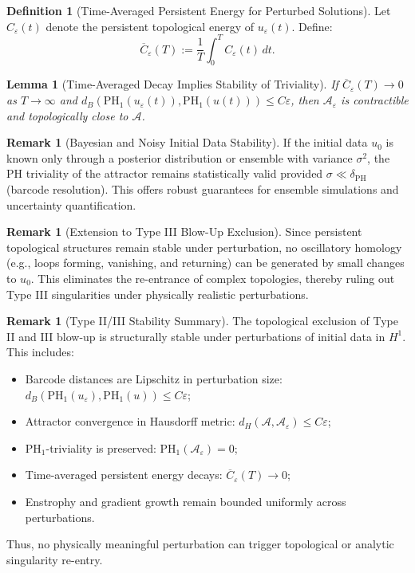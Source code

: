 \documentclass[11pt]{article}
\newtheorem{lemma}[theorem]{Lemma}
\theoremstyle{definition}
\newtheorem{definition}[theorem]{Definition}
\newtheorem{remark}[theorem]{Remark}
\begin{document}
\begin{definition}[Time-Averaged Persistent Energy for Perturbed Solutions]
Let $C_\varepsilon(t)$ denote the persistent topological energy of $u_\varepsilon(t)$. Define:
\[
\overline{C}_\varepsilon(T) := \frac{1}{T} \int_0^T C_\varepsilon(t)\, dt.
\]
\end{definition}

\begin{lemma}[Time-Averaged Decay Implies Stability of Triviality]
If $\overline{C}_\varepsilon(T) \to 0$ as $T \to \infty$ and $d_B(\mathrm{PH}_1(u_\varepsilon(t)), \mathrm{PH}_1(u(t))) \le C \varepsilon$, then $\mathcal{A}_\varepsilon$ is contractible and topologically close to $\mathcal{A}$.
\end{lemma}

\begin{remark}[Bayesian and Noisy Initial Data Stability]
If the initial data $u_0$ is known only through a posterior distribution or ensemble with variance $\sigma^2$, the PH triviality of the attractor remains statistically valid provided $\sigma \ll \delta_{\mathrm{PH}}$ (barcode resolution). This offers robust guarantees for ensemble simulations and uncertainty quantification.
\end{remark}

\begin{remark}[Extension to Type III Blow-Up Exclusion]
Since persistent topological structures remain stable under perturbation, no oscillatory homology (e.g., loops forming, vanishing, and returning) can be generated by small changes to $u_0$. This eliminates the re-entrance of complex topologies, thereby ruling out Type III singularities under physically realistic perturbations.
\end{remark}

\begin{remark}[Type II/III Stability Summary]
The topological exclusion of Type II and III blow-up is structurally stable under perturbations of initial data in $H^1$. This includes:
\begin{itemize}
    \item Barcode distances are Lipschitz in perturbation size: $d_B(\mathrm{PH}_1(u_\varepsilon), \mathrm{PH}_1(u)) \le C \varepsilon$;
    \item Attractor convergence in Hausdorff metric: $d_H(\mathcal{A}, \mathcal{A}_\varepsilon) \le C \varepsilon$;
    \item PH$_1$-triviality is preserved: $\mathrm{PH}_1(\mathcal{A}_\varepsilon) = 0$;
    \item Time-averaged persistent energy decays: $\overline{C}_\varepsilon(T) \to 0$;
    \item Enstrophy and gradient growth remain bounded uniformly across perturbations.
\end{itemize}
Thus, no physically meaningful perturbation can trigger topological or analytic singularity re-entry.
\end{remark}
\end{document}
